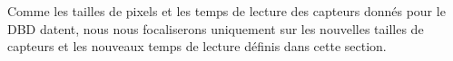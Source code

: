   \medskip

  Comme les tailles de pixels et les temps de lecture des capteurs donn\'es pour le DBD datent, nous nous focaliserons uniquement sur les nouvelles tailles de capteurs et les nouveaux temps de lecture d\'efinis dans cette section.
  
%   
% 
%   
% 
%   
%   
%   
%   
